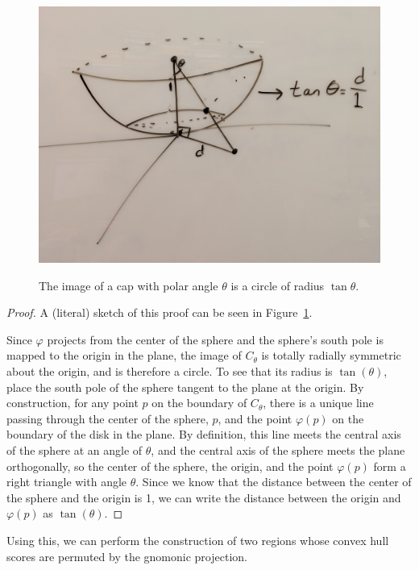 \begin{figure}
    \centering
    \includegraphics[width=.8\textwidth]{figs/gnom_cap.jpg}\\
    \caption{The image of a cap with polar angle $\theta$ is a circle of radius $\tan\theta$.}
    \label{fig:gnomcap}
\end{figure}



\begin{proof}

A (literal) sketch of this proof can be seen in Figure~\ref{fig:gnomcap}.

Since $\varphi$ projects from the center of the sphere and the sphere's south pole is mapped to the origin in the plane, the image of $C_\theta$ is totally radially symmetric about the origin, and is therefore a circle.  To see that its radius is $\tan(\theta)$, place the south pole of the sphere tangent to the plane at the origin. By construction, for any point $p$ on the boundary of $C_\theta$, there is a unique line passing through the center of the sphere, $p$, and the point $\varphi(p)$ on the boundary of the disk in the plane.  By definition, this line meets the central axis of the sphere at an angle of $\theta$, and the central axis of the sphere meets the plane orthogonally, so the center of the sphere, the origin, and the point $\varphi(p)$ form a right triangle with angle $\theta$.  Since we know that the distance between the center of the sphere and the origin is 1, we can write the distance between the origin and $\varphi(p)$ as $\tan(\theta)$.


\end{proof}



Using this, we can perform the construction of two regions whose convex hull scores are permuted by the gnomonic projection.

